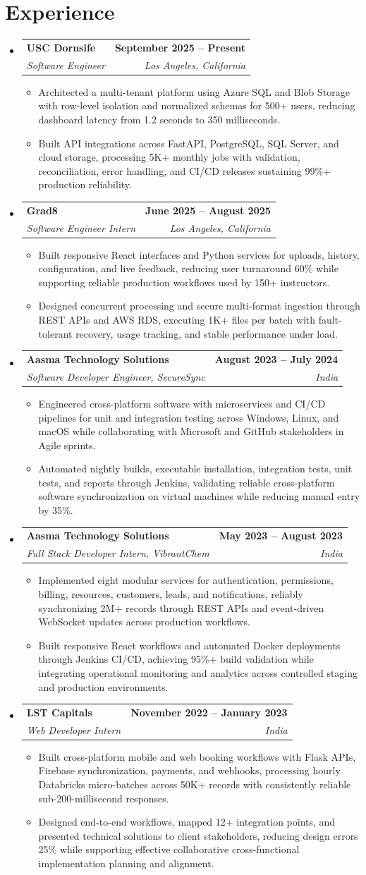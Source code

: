 \documentclass[letterpaper,10pt]{article}
\makeatletter
\newcommand{\itemTail}{\vspace{-4pt}}
\newcommand{\sectionGap}{\vspace{-8pt}}
\newcommand{\roleGap}{\vspace{2pt}}
\newcommand{\resumeItem}[1]{\item\small{{#1 \itemTail}}}
\newcommand{\resumeSubheading}[4]{\vspace{-1pt}\item\begin{tabular*}{1.0\textwidth}[t]{l@{\extracolsep{\fill}}r}\textbf{#1} & \textbf{\small #2} \\\textit{\small#3} & \textit{\small #4} \\\end{tabular*}\vspace{-2pt}}
\newcommand{\resumeSubHeadingListStart}{\begin{itemize}[leftmargin=0.0in, label={}]}
\newcommand{\resumeSubHeadingListEnd}{\end{itemize}}
\newcommand{\resumeItemListStart}{\begin{itemize}[leftmargin=0.15in,label=\textbullet,itemsep=3pt,topsep=0pt,parsep=0pt,partopsep=0pt]}
\newcommand{\resumeItemListEnd}{\end{itemize}\vspace{-4pt}}
\makeatother
\begin{document}
\section{Experience}
\resumeSubHeadingListStart
\resumeSubheading{USC Dornsife}{September 2025 -- Present}{Software Engineer}{Los Angeles, California}
\resumeItemListStart
\resumeItem{Architected a multi-tenant platform using Azure SQL and Blob Storage with row-level isolation and normalized schemas for 500+ users, reducing dashboard latency from 1.2 seconds to 350 milliseconds.}
\resumeItem{Built API integrations across FastAPI, PostgreSQL, SQL Server, and cloud storage, processing 5K+ monthly jobs with validation, reconciliation, error handling, and CI/CD releases sustaining 99\%+ production reliability.}
\resumeItemListEnd
\roleGap
\resumeSubheading{Grad8}{June 2025 -- August 2025}{Software Engineer Intern}{Los Angeles, California}
\resumeItemListStart
\resumeItem{Built responsive React interfaces and Python services for uploads, history, configuration, and live feedback, reducing user turnaround 60\% while supporting reliable production workflows used by 150+ instructors.}
\resumeItem{Designed concurrent processing and secure multi-format ingestion through REST APIs and AWS RDS, executing 1K+ files per batch with fault-tolerant recovery, usage tracking, and stable performance under load.}
\resumeItemListEnd
\roleGap
\resumeSubheading{Aasma Technology Solutions}{August 2023 -- July 2024}{Software Developer Engineer, SecureSync}{India}
\resumeItemListStart
\resumeItem{Engineered cross-platform software with microservices and CI/CD pipelines for unit and integration testing across Windows, Linux, and macOS while collaborating with Microsoft and GitHub stakeholders in Agile sprints.}
\resumeItem{Automated nightly builds, executable installation, integration tests, unit tests, and reports through Jenkins, validating reliable cross-platform software synchronization on virtual machines while reducing manual entry by 35\%.}
\resumeItemListEnd
\roleGap
\resumeSubheading{Aasma Technology Solutions}{May 2023 -- August 2023}{Full Stack Developer Intern, VibrantChem}{India}
\resumeItemListStart
\resumeItem{Implemented eight modular services for authentication, permissions, billing, resources, customers, leads, and notifications, reliably synchronizing 2M+ records through REST APIs and event-driven WebSocket updates across production workflows.}
\resumeItem{Built responsive React workflows and automated Docker deployments through Jenkins CI/CD, achieving 95\%+ build validation while integrating operational monitoring and analytics across controlled staging and production environments.}
\resumeItemListEnd
\roleGap
\resumeSubheading{LST Capitals}{November 2022 -- January 2023}{Web Developer Intern}{India}
\resumeItemListStart
\resumeItem{Built cross-platform mobile and web booking workflows with Flask APIs, Firebase synchronization, payments, and webhooks, processing hourly Databricks micro-batches across 50K+ records with consistently reliable sub-200-millisecond responses.}
\resumeItem{Designed end-to-end workflows, mapped 12+ integration points, and presented technical solutions to client stakeholders, reducing design errors 25\% while supporting effective collaborative cross-functional implementation planning and alignment.}
\resumeItemListEnd
\resumeSubHeadingListEnd
\sectionGap
\end{document}
